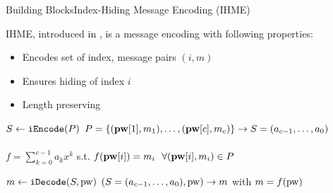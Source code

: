 \documentclass[notes]{beamer}
\begin{document}
\begin{frame}{Building Blocks}{Index-Hiding Message Encoding (IHME)}

	IHME, introduced in \cite{Manulis2010}, is a message encoding with following properties: %
	\begin{itemize}
		\item Encodes set of index, message pairs $(i,m)$
		\item Ensures hiding of index $i$
		\item Length preserving
	\end{itemize}

	\vspace*{1em}

	\pause
	\begin{beamerboxesrounded}[upper=uppercol,lower=lowercol,shadow=true]{$S\gets\mathtt{iEncode}(P)$}
		$P=\{(\mathbf{pw}[1],m_{1}),\dots,(\mathbf{pw}[c],m_{c})\}\rightarrow S=(a_{c-1},\dots,a_0)$\\\\
		$f=\sum^{c-1}_{k=0}a_kx^k$ s.t. $f(\mathbf{pw}[i])=m_{i}~~\forall(\mathbf{pw}[i],m_{i})\in P$
	\end{beamerboxesrounded}
	
	\vspace*{1em}

	\begin{beamerboxesrounded}[upper=uppercol,lower=lowercol,shadow=true]{$m\gets\mathtt{iDecode}(S, \mathrm{pw})$}
		$(S=(a_{c-1},\dots,a_0), \mathrm{pw})\rightarrow m$ with	$m=f(\mathrm{pw})$
	\end{beamerboxesrounded}
	
\end{frame}

%
%	
%
%
%
\end{document}

